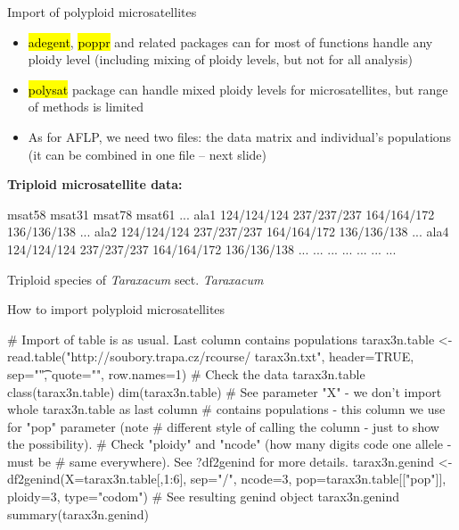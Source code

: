 \documentclass[compress, ucs, xelatex, 11pt, xcolor=svgnames,
  hyperref={
    bookmarks=true,
    unicode=true,
    colorlinks=true,
    pdftitle={Molecular data in R},
    plainpages=false,
    pdfauthor={Vojtech Zeisek},
    pdfsubject={Course about phylogeny and evolution in R},
    pdfcreator={XeLaTeX},
    pdfkeywords={R, evolution, phylogeny, molecular data},
    linkcolor=Tomato,
    anchorcolor=SaddleBrown,
    citecolor=Goldenrod,
    filecolor=DarkMagenta,
    menucolor=Sienna,
    urlcolor=DarkTurquoise,
    pdftex},
  url={hyphens, lowtilde} %
  ]{beamer}
\renewcommand{\texttt}[1]{\hl{\ttfamily #1}}
\begin{document}
\begin{frame}[fragile]{Import of polyploid microsatellites}
  \vfill
  \begin{itemize}
    \item \texttt{adegent}, \texttt{poppr} and related packages can for most of functions handle any ploidy level (including mixing of ploidy levels, but not for all analysis)
    \item \texttt{polysat} package can handle mixed ploidy levels for microsatellites, but range of methods is limited
    \item As for AFLP, we need two files: the data matrix and individual's populations (it can be combined in one file -- next slide)
  \end{itemize}
  \vfill
  \textbf{Triploid microsatellite data:}
  \vfil
  \begin{spluscode}
              msat58      msat31      msat78      msat61 ...
    ala1 124/124/124 237/237/237 164/164/172 136/136/138 ...
    ala2 124/124/124 237/237/237 164/164/172 136/136/138 ...
    ala4 124/124/124 237/237/237 164/164/172 136/136/138 ...
     ...         ...         ...         ...         ... ...
  \end{spluscode}
  \vfill
  \begin{footnotesize}
    Triploid species of \textit{Taraxacum} sect. \textit{Taraxacum}
  \end{footnotesize}
  \vfill
\end{frame}

\begin{frame}[fragile]{How to import polyploid microsatellites}
  \begin{spluscode}
    # Import of table is as usual. Last column contains populations
    tarax3n.table <- read.table("http://soubory.trapa.cz/rcourse/
      tarax3n.txt", header=TRUE, sep="\t", quote="", row.names=1)
    # Check the data
    tarax3n.table
    class(tarax3n.table)
    dim(tarax3n.table)
    # See parameter "X" - we don't import whole tarax3n.table as last column
    # contains populations - this column we use for "pop" parameter (note
    # different style of calling the column - just to show the possibility).
    # Check "ploidy" and "ncode" (how many digits code one allele - must be
    # same everywhere). See ?df2genind for more details.
    tarax3n.genind <- df2genind(X=tarax3n.table[,1:6], sep="/", ncode=3,
      pop=tarax3n.table[["pop"]], ploidy=3, type="codom")
    # See resulting genind object
    tarax3n.genind
    summary(tarax3n.genind)
  \end{spluscode}
\end{frame}
\end{document}
